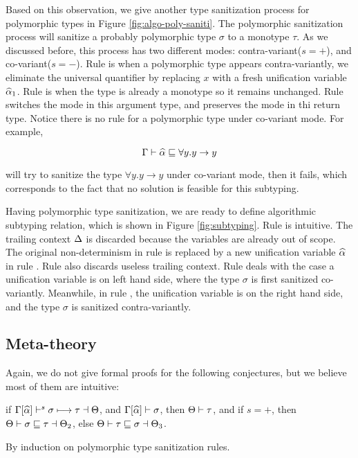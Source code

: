 Based on this observation, we give another type sanitization process for
polymorphic types in Figure \ref{fig:algo-poly-saniti}. The polymorphic
sanitization process will sanitize a probably polymorphic type $\sigma$ to a
monotype $\tau$. As we discussed before, this process has two different modes:
contra-variant($s=+$), and co-variant($s = -$). Rule  is when a
polymorphic type appears contra-variantly, we eliminate the universal
quantifier by replacing $x$ with a fresh unification variable $\widehat{\alpha}_1$. Rule
 is when the type is already a monotype so it remains unchanged.
Rule  switches the mode in this argument type, and preserves the mode in
thi return type. Notice there is no rule for a polymorphic type under co-variant
mode. For example,

\[
\Gamma {} \vdash \widehat{\alpha} \sqsubseteq \forall y .y \to y
\]

\noindent will try to sanitize the type $\forall y. y \to y$ under co-variant
mode, then it fails, which corresponds to the
fact that no solution is feasible for this subtyping.

Having polymorphic type sanitization, we are ready to define algorithmic subtyping
relation, which is shown in Figure \ref{fig:subtyping}. Rule  is
intuitive. The trailing context $\Delta$ is discarded because the variables are
already out of scope. The original
non-determinism in rule  is replaced by a new unification variable
$\widehat{\alpha}$ in rule . Rule  also discards useless trailing
context.
Rule  deals with the case a unification variable is on
left hand side, where the type $\sigma$ is first sanitized co-variantly.
Meanwhile, in rule , the unification variable is on the right hand
side, and the type $\sigma$ is sanitized contra-variantly.

\subsection{Meta-theory}

Again, we do not give formal proofs for the following conjectures, but we
believe most of them are intuitive:

\begin{conjecture}
  if $\Gamma[\widehat{\alpha}] \vdash^s \sigma \longmapsto \tau \dashv \Theta$,
  and $\Gamma[\widehat{\alpha}] \vdash \sigma$,
  then $\Theta \vdash \tau$,
  and if $s=+$, then $\Theta \vdash \sigma \sqsubseteq \tau \dashv \Theta_2$,
  else $\Theta \vdash \tau \sqsubseteq \sigma \dashv \Theta_3$.
\end{conjecture}
\begin{hproof}
  By induction on polymorphic type sanitization rules.
\end{hproof}


